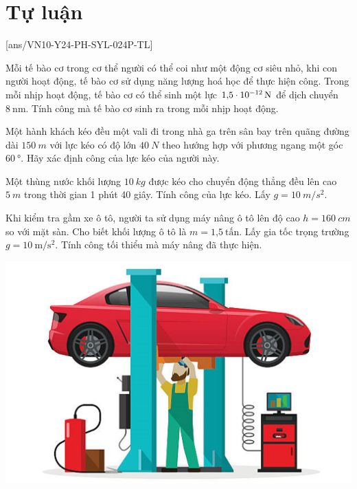 \section{Tự luận}
\setcounter{ex}{0}
[ans/VN10-Y24-PH-SYL-024P-TL]
\begin{ex}
Mỗi tế bào cơ trong cơ thể người có thể coi như một động cơ siêu nhỏ, khi con người hoạt động, tế bào cơ sử dụng năng lượng hoá học để thực hiện công. Trong mỗi nhịp hoạt động, tế bào cơ có thể sinh một lực $\SI{1.5E-12}{\newton}$ để dịch chuyển $\SI{8}{\nano\meter}$. Tính công mà tế bào cơ sinh ra trong mỗi nhịp hoạt động.	
\end{ex}
\begin{ex}
		Một hành khách kéo đều một vali đi trong nhà ga trên sân bay trên quãng đường dài $\SI{150}{m}$ với lực kéo có độ lớn $\SI{40}{N}$ theo hướng hợp với phương ngang một góc $\SI{60}{\degree}$. Hãy xác định công của lực kéo của người này.
\end{ex}
\begin{ex}
	Một thùng nước khối lượng $\SI{10}{kg}$ được kéo cho chuyển động thẳng đều lên cao $\SI{5}{m}$ trong thời gian 1 phút 40 giây. Tính công của lực kéo. Lấy $g=\SI{10}{m/s^2}$.
\end{ex}
\begin{ex}
	Khi kiểm tra gầm xe ô tô, người ta sử dụng máy nâng ô tô lên độ cao $h = \SI{160}{cm}$ so với mặt sàn. Cho biết khối lượng ô tô là $m = \text{1,5}\ \text{tấn}$. Lấy gia tốc trọng trường $g=\SI{10}{\meter/\second^2}$. Tính công tối thiểu mà máy nâng đã thực hiện.
	\begin{center}
		\includegraphics[width=0.3\linewidth]{../figs/VN10-2023-PH-TP024-P-2}
	\end{center}
\end{ex}
